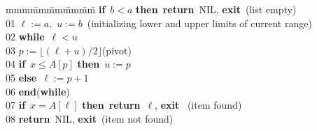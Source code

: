 \documentclass[12pt]{article}
\begin{document}
\def\bfor{\textbf{for}}
\def\bdo{\textbf{do}}
\def\bwhile{\textbf{while}}
\def\bend{\textbf{end}}
\def\bif{\textbf{if}}
\def\bthen{\textbf{then}}
\def\belse{\textbf{else}}
\def\breturn{\textbf{return}}
\def\bexit{\textbf{exit}}
\def\bprint{\textbf{print}}
\begin{tabbing}
mmm\= mm\= mm\= mm\= mm\=  \> \bif\ $b<a$ \bthen\ \breturn\ NIL, \bexit\ \quad (list empty) \\
01 \> $\ell:=a,$ $u:=b$\ (initializing lower and upper limits of
current range) \\
02 \> \bwhile\ $\ell<u$ \\
03 \> \> $p:=\lfloor (\ell+u)/2\rfloor$\qquad (pivot) \\
04 \> \> \bif\ $x\le A[p]$ \bthen\ $u:=p$ \\
05 \> \> \> \belse\ $\ell:=p+1$ \\
06 \> \bend(\bwhile) \\
07 \> \bif\ $x=A[\ell]$ \bthen\ \breturn\ $\ell$, \bexit\ \quad
(item found)\\
08 \> \breturn\ NIL, \bexit\ \quad (item not found) \\
\end{tabbing}
\end{document}
